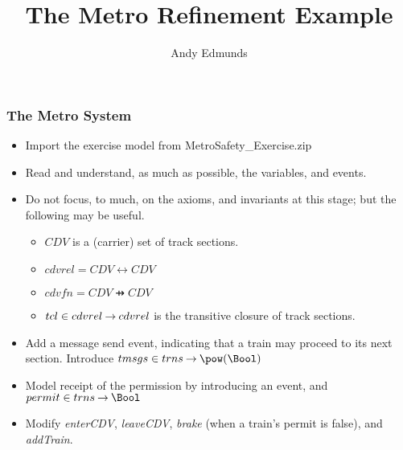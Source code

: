 \documentclass{beamer}
\title{The Metro Refinement Example}
\author{Andy Edmunds}
\institute{ University of Southampton }
\begin{document}
\begin{frame}
\titlepage
\end{frame}

\begin{frame}
\frametitle{The Metro System}
\begin{itemize}
	\item Import the exercise model from MetroSafety\_Exercise.zip
	\item Read and understand, as much as possible, the variables, and events.
	\item Do not focus, to much, on the axioms, and invariants at this stage; but the following may be useful.
	\begin{itemize}
		\item $CDV$ is a (carrier) set of track sections.
		\item $cdvrel = CDV \rel CDV$
		\item $cdvfn = CDV \pfun CDV$
		\item $tcl \in cdvrel \mathbin\rightarrow cdvrel$ is the transitive closure of track sections.
	\end{itemize}
	\item Add a message send event, indicating that a train may proceed to its next section. Introduce $tmsgs \in trns \tfun \pow(\Bool)$
	\item Model receipt of the permission by introducing an event, and $ permit \in trns \tfun \Bool $
	\item Modify \emph{enterCDV}, \emph{leaveCDV}, \emph{brake} (when a train's permit is false), and \emph{addTrain}.
\end{itemize}
\end{frame}
\end{document}
